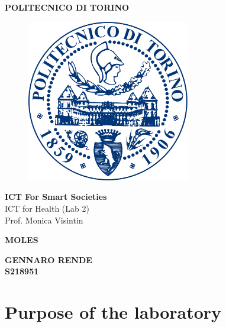 \documentclass[12pt]{report}
\begin{document}

\begin{center}
\textbf{\Huge POLITECNICO DI TORINO}

\begin{figure}[H]
  \centering
  \includegraphics[width=2.8in]{poli.png}
\end{figure}

\end{center}
\begin{center}
\vspace{0.05in}
\Large{\textbf{ICT For Smart Societies}\\
\vspace{0.08in}
\Large ICT for Health (Lab 2)}\\
\large Prof. Monica Visintin
\end{center}
\begin{center}
\vspace{0.08in}
\end{center}

\vspace{0.8in}
\begin{center}
\textbf{\Huge MOLES}
\end{center}

\vspace{0.75in}
\begin{center}
\vspace{1in}
\textbf{\Large GENNARO RENDE}\\
\textbf{S218951}\\
\end{center}



\pagebreak


\chapter{Purpose of the laboratory}
\end{document}
